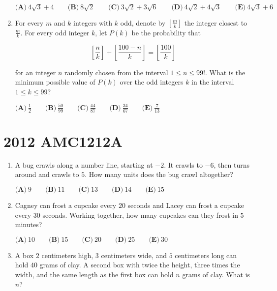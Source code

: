 \documentclass{article}
\begin{document}
\begin{enumerate}[label=\arabic*., itemsep=0.5em]
$\textbf{(A)}\ 4\sqrt{3} + 4 \qquad \textbf{(B)}\ 8\sqrt{2} \qquad \textbf{(C)}\  3\sqrt{2} + 3\sqrt{6} \qquad \textbf{(D)}\  4\sqrt{2} + 4\sqrt{3} \qquad \textbf{(E)}\  4\sqrt{3} + 6$\par \vspace{0.5em}\item For every $m$ and $k$ integers with $k$ odd, denote by $\left[\frac{m}{k}\right]$ the integer closest to $\frac{m}{k}$. For every odd integer $k$, let $P(k)$ be the probability that


\begin{equation*}
\left[\frac{n}{k}\right] + \left[\frac{100 - n}{k}\right] = \left[\frac{100}{k}\right]
\end{equation*}


for an integer $n$ randomly chosen from the interval $1 \leq n \leq 99!$. What is the minimum possible value of $P(k)$ over the odd integers $k$ in the interval $1 \leq k \leq 99$?

$\textbf{(A)}\ \frac{1}{2} \qquad \textbf{(B)}\ \frac{50}{99} \qquad \textbf{(C)}\ \frac{44}{87} \qquad \textbf{(D)}\  \frac{34}{67} \qquad \textbf{(E)}\  \frac{7}{13}$\par \vspace{0.5em}\end{enumerate}\newpage\section*{2012 AMC1212A}\begin{enumerate}[label=\arabic*., itemsep=0.5em]\item A bug crawls along a number line, starting at $-2$. It crawls to $-6$, then turns around and crawls to $5$. How many units does the bug crawl altogether?

$ \textbf{(A)}\ 9\qquad\textbf{(B)}\ 11\qquad\textbf{(C)}\ 13\qquad\textbf{(D)}\ 14\qquad\textbf{(E)}\ 15 $\par \vspace{0.5em}\item Cagney can frost a cupcake every $20$ seconds and Lacey can frost a cupcake every $30$ seconds. Working together, how many cupcakes can they frost in $5$ minutes?

$ \textbf{(A)}\ 10\qquad\textbf{(B)}\ 15\qquad\textbf{(C)}\ 20\qquad\textbf{(D)}\ 25\qquad\textbf{(E)}\ 30 $\par \vspace{0.5em}\item A box $2$ centimeters high, $3$ centimeters wide, and $5$ centimeters long can hold $40$ grams of clay.  A second box with twice the height, three times the width, and the same length as the first box can hold $n$ grams of clay.  What is $n$?


\end{enumerate}
\end{document}
